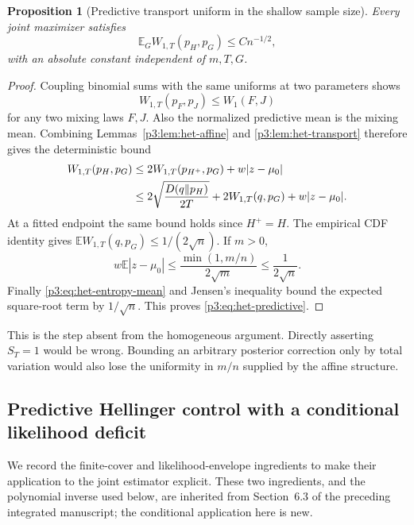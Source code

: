 \documentclass[11pt,a4paper]{article}
\newtheorem{proposition}[theorem]{Proposition}
\theoremstyle{definition}
\theoremstyle{remark}
\numberwithin{equation}{section}
\begin{document}
\begin{proposition}[Predictive transport uniform in the shallow sample size]
\label{p3:prop:het-predictive}
Every joint maximizer satisfies
\begin{equation}\label{p3:eq:het-predictive}
 \mathbb E_GW_{1,T}(p_H,p_G)\le Cn^{-1/2},
\end{equation}
with an absolute constant independent of $m,T,G$.
\end{proposition}
\begin{proof}
Coupling binomial sums with the same uniforms at two parameters shows
\[
 W_{1,T}(p_F,p_J)\le W_1(F,J)
\]
for any two mixing laws $F,J$.  Also the normalized predictive mean is the
mixing mean.  Combining Lemmas~\ref{p3:lem:het-affine} and
\ref{p3:lem:het-transport} therefore gives the deterministic bound
\begin{align}
 W_{1,T}(p_H,p_G)
 &\le2W_{1,T}(p_{H^+},p_G)+w|z-\mu_0|\notag\\
 &\le2\sqrt{\frac{D(q\Vert p_H)}{2T}}
             +2W_{1,T}(q,p_G)+w|z-\mu_0|.
             \label{p3:eq:het-master-transport}
\end{align}
At a fitted endpoint the same bound holds since $H^+=H$.
The empirical CDF identity gives
$\mathbb EW_{1,T}(q,p_G)\le1/(2\sqrt n)$.  If $m>0$,
\[
 w\mathbb E|z-\mu_0|
 \le\frac{\min(1,m/n)}{2\sqrt m}\le\frac1{2\sqrt n}.
\]
Finally \eqref{p3:eq:het-entropy-mean} and Jensen's inequality bound the
expected square-root term by $1/\sqrt n$.  This proves
\eqref{p3:eq:het-predictive}.
\end{proof}

This is the step absent from the homogeneous argument.  Directly asserting
$S_T=1$ would be wrong.  Bounding an arbitrary posterior correction only
by total variation would also lose the uniformity in $m/n$ supplied by
the affine structure.

\subsection{Predictive Hellinger control with a conditional likelihood deficit}

We record the finite-cover and likelihood-envelope ingredients to make
their application to the joint estimator explicit.  These two ingredients,
and the polynomial inverse used below, are inherited from Section~6.3 of
the preceding integrated manuscript; the conditional application here is
new.
\end{document}
